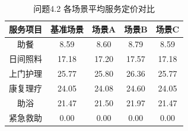 \begin{table}[htbp]
\centering
\caption{问题4.2 各场景平均服务定价对比}
\begin{tabular}{|c|c|c|c|c|}
\hline
服务项目 & 基准场景 & 场景A & 场景B & 场景C \\
\hline
助餐 & 8.59 & 8.60 & 8.79 & 8.59 \\
日间照料 & 17.18 & 17.20 & 17.57 & 17.18 \\
上门护理 & 25.77 & 25.80 & 26.36 & 25.77 \\
康复理疗 & 24.05 & 24.08 & 24.60 & 24.05 \\
助浴 & 21.47 & 21.50 & 21.97 & 21.47 \\
紧急救助 & 0.00 & 0.00 & 0.00 & 0.00 \\
\hline
\end{tabular}
\end{table}
